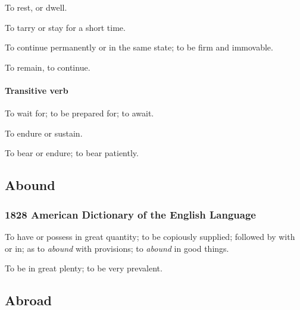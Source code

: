 				\begin{compactitem}
					\item[1] To rest, or dwell.
					\item[2] To tarry or stay for a short time.
					\item[3] To continue permanently or in the same state; to be firm and immovable.
					\item[4] To remain, to continue.
				\end{compactitem}
				
			\paragraph{Transitive verb}
			
				\begin{compactitem}
					\item[1] To wait for; to be prepared for; to await.
					\item[2] To endure or sustain.
					\item[3] To bear or endure; to bear patiently.
				\end{compactitem}
				
	\subsection{Abound} %
		\label{ABOUND}
		
		\subsubsection{1828 American Dictionary of the English Language}
		
			\begin{compactitem}
				\item[1] To have or possess in great quantity; to be copiously supplied; followed by with or in; as to \textit{abound} with provisions; to \textit{abound} in good things.
				\item[2] To be in great plenty; to be very prevalent.
			\end{compactitem}
			
	\subsection{Abroad} %
		\label{ABROAD}
		

